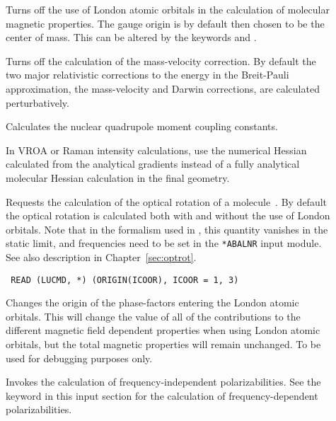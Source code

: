 \begin{description}
\item[] Turns off the use of London atomic
orbitals in
the calculation of molecular magnetic properties. The gauge origin is
by default then chosen to be the center of mass. This can be altered
by the keywords  and .

\item[] Turns off the calculation of the
mass-velocity
correction. By default the two major relativistic corrections to the
energy  in the Breit-Pauli approximation, the mass-velocity and Darwin
corrections, are calculated 
perturbatively.

\item[] Calculates the nuclear quadrupole moment
coupling constants. 

\item[] In VROA or Raman intensity calculations, use the
  numerical Hessian calculated from the analytical gradients instead
  of a fully analytical molecular Hessian calculation in the final
  geometry.

\item[] Requests the calculation of the optical rotation
of a molecule~\cite{thkrklbpjjofd99,plpmp91}. By default the optical
rotation is calculated 
both with and without the use of London orbitals. Note that in the
formalism used in \siraba , this quantity vanishes in the static
limit, and frequencies need to be set in the \verb|*ABALNR| input
module. See also description in Chapter~\ref{sec:optrot}.

\item[]\verb| |\newline
\verb|READ (LUCMD, *) (ORIGIN(ICOOR), ICOOR = 1, 3)|

Changes the origin of the phase-factors entering the London atomic
orbitals. This will change the value of all of the contributions to
the different magnetic field dependent properties when using London
atomic orbitals, but the total magnetic properties will remain
unchanged. To be used for debugging purposes only.

\item[] Invokes the calculation of frequency-independent
polarizabilities. See the keyword  in
this input section for the calculation of frequency-dependent
polarizabilities.


\end{description}
